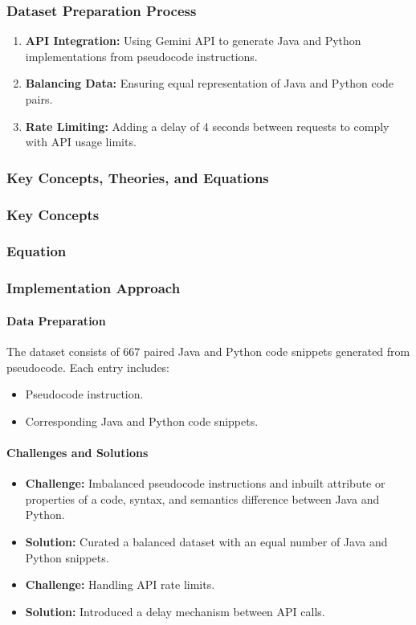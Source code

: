 \documentclass{dhbenelux}
\begin{document}
\subsubsection{Dataset Preparation Process}
\begin{enumerate}
    \item \textbf{API Integration:} Using Gemini API to generate Java and Python implementations from pseudocode instructions.
    \item \textbf{Balancing Data:} Ensuring equal representation of Java and Python code pairs.
    \item \textbf{Rate Limiting:} Adding a delay of 4 seconds between requests to comply with API usage limits.
\end{enumerate}



\subsubsection{Key Concepts, Theories, and Equations}

\subsubsection{Key Concepts}
\subsubsection{Equation} 



\subsubsection{Implementation Approach}

\paragraph{Data Preparation} The dataset consists of 667 paired Java and Python code snippets generated from pseudocode. Each entry includes:
\begin{itemize}
    \item Pseudocode instruction.
    \item Corresponding Java and Python code snippets.
\end{itemize}

\paragraph{Challenges and Solutions}
\begin{itemize}
    \item \textbf{Challenge:} Imbalanced pseudocode instructions and inbuilt attribute or properties of a code, syntax, and semantics difference between Java and Python.
    \item \textbf{Solution:} Curated a balanced dataset with an equal number of Java and Python snippets.
    \item \textbf{Challenge:} Handling API rate limits.
    \item \textbf{Solution:} Introduced a delay mechanism between API calls.
\end{itemize}
\end{document}
